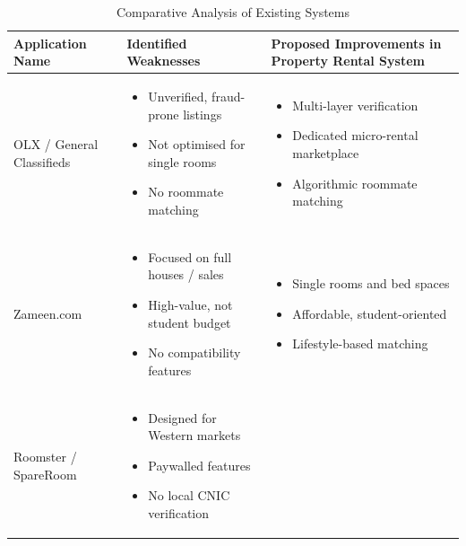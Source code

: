 \vspace{0.5cm}

\begin{table}[h!]
\centering
\caption{Comparative Analysis of Existing Systems}
\renewcommand{\arraystretch}{1.3}

\begin{tabularx}{\textwidth}{|>{\raggedright\arraybackslash}p{3cm}|X|X|}
\hline
\textbf{Application Name} & \textbf{Identified Weaknesses} & \textbf{Proposed Improvements in Property Rental System} \\
\hline
OLX / General Classifieds &
\begin{itemize}[leftmargin=*, noitemsep, topsep=0pt]
    \item Unverified, fraud-prone listings
    \item Not optimised for single rooms
    \item No roommate matching
\end{itemize}
&
\begin{itemize}[leftmargin=*, noitemsep, topsep=0pt]
    \item Multi-layer verification
    \item Dedicated micro-rental marketplace
    \item Algorithmic roommate matching
\end{itemize}
\\
\hline
Zameen.com &
\begin{itemize}[leftmargin=*, noitemsep, topsep=0pt]
    \item Focused on full houses / sales
    \item High-value, not student budget
    \item No compatibility features
\end{itemize}
&
\begin{itemize}[leftmargin=*, noitemsep, topsep=0pt]
    \item Single rooms and bed spaces
    \item Affordable, student-oriented
    \item Lifestyle-based matching
\end{itemize}
\\
\hline
Roomster / SpareRoom &
\begin{itemize}[leftmargin=*, noitemsep, topsep=0pt]
    \item Designed for Western markets
    \item Paywalled features
    \item No local CNIC verification
\end{itemize}

\end{tabularx}
\end{table}
